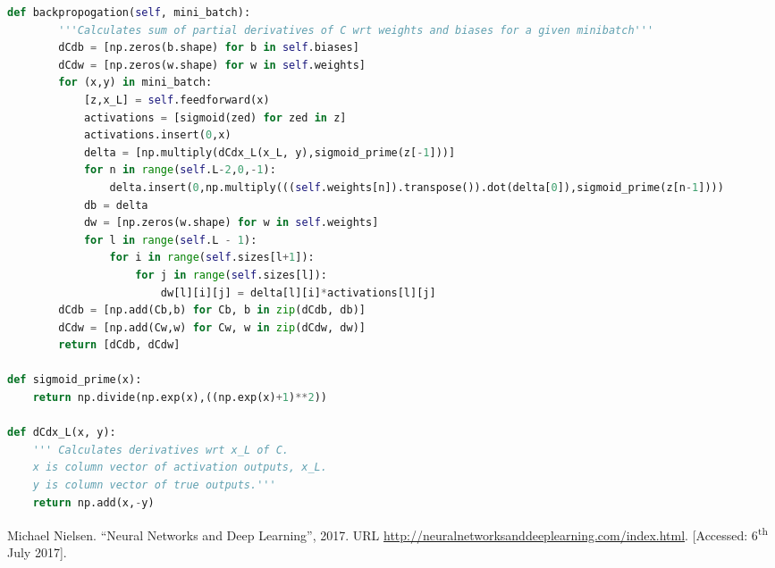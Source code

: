 \documentclass[10pt]{article}
\begin{document}
\begin{lstlisting}[language=Python, breaklines, basicstyle=\small]
	def backpropogation(self, mini_batch):
		'''Calculates sum of partial derivatives of C wrt weights and biases for a given minibatch'''
		dCdb = [np.zeros(b.shape) for b in self.biases]
		dCdw = [np.zeros(w.shape) for w in self.weights]
		for (x,y) in mini_batch:
			[z,x_L] = self.feedforward(x)
			activations = [sigmoid(zed) for zed in z]
			activations.insert(0,x)
			delta = [np.multiply(dCdx_L(x_L, y),sigmoid_prime(z[-1]))]
			for n in range(self.L-2,0,-1):
				delta.insert(0,np.multiply(((self.weights[n]).transpose()).dot(delta[0]),sigmoid_prime(z[n-1])))
			db = delta
			dw = [np.zeros(w.shape) for w in self.weights]
			for l in range(self.L - 1):
				for i in range(self.sizes[l+1]):
					for j in range(self.sizes[l]):
						dw[l][i][j] = delta[l][i]*activations[l][j]
		dCdb = [np.add(Cb,b) for Cb, b in zip(dCdb, db)]
		dCdw = [np.add(Cw,w) for Cw, w in zip(dCdw, dw)]
		return [dCdb, dCdw]

def sigmoid_prime(x):
	return np.divide(np.exp(x),((np.exp(x)+1)**2))

def dCdx_L(x, y):
	''' Calculates derivatives wrt x_L of C.
	x is column vector of activation outputs, x_L.
	y is column vector of true outputs.'''
	return np.add(x,-y)
\end{lstlisting}

\begin{thebibliography}{9}
	Michael Nielsen.
	``Neural Networks and Deep Learning'',
	2017.
	URL \url{http://neuralnetworksanddeeplearning.com/index.html}.
	[Accessed: 6\textsuperscript{th} July 2017].
\end{thebibliography}
\end{document}
